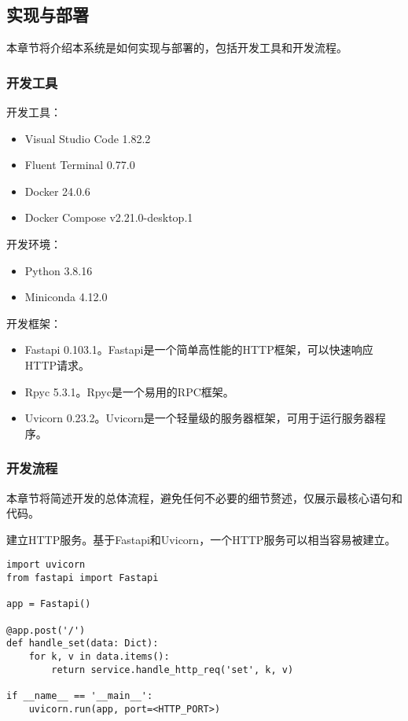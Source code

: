 \subsection{实现与部署}

本章节将介绍本系统是如何实现与部署的，包括开发工具和开发流程。

\subsubsection{开发工具}

开发工具：
\begin{itemize}
    \item Visual Studio Code 1.82.2
    \item Fluent Terminal 0.77.0
    \item Docker 24.0.6
    \item Docker Compose v2.21.0-desktop.1
\end{itemize}

开发环境：
\begin{itemize}
    \item Python 3.8.16
    \item Miniconda 4.12.0
\end{itemize}

开发框架：
\begin{itemize}
    \item Fastapi 0.103.1。Fastapi是一个简单高性能的HTTP框架，可以快速响应HTTP请求。
    \item Rpyc 5.3.1。Rpyc是一个易用的RPC框架。
    \item Uvicorn 0.23.2。Uvicorn是一个轻量级的服务器框架，可用于运行服务器程序。
\end{itemize}

\subsubsection{开发流程}

本章节将简述开发的总体流程，避免任何不必要的细节赘述，仅展示最核心语句和代码。

建立HTTP服务。基于Fastapi和Uvicorn，一个HTTP服务可以相当容易被建立。

\begin{lstlisting}
import uvicorn
from fastapi import Fastapi

app = Fastapi()

@app.post('/')
def handle_set(data: Dict):
    for k, v in data.items():
        return service.handle_http_req('set', k, v)

if __name__ == '__main__':
    uvicorn.run(app, port=<HTTP_PORT>)
\end{lstlisting}

